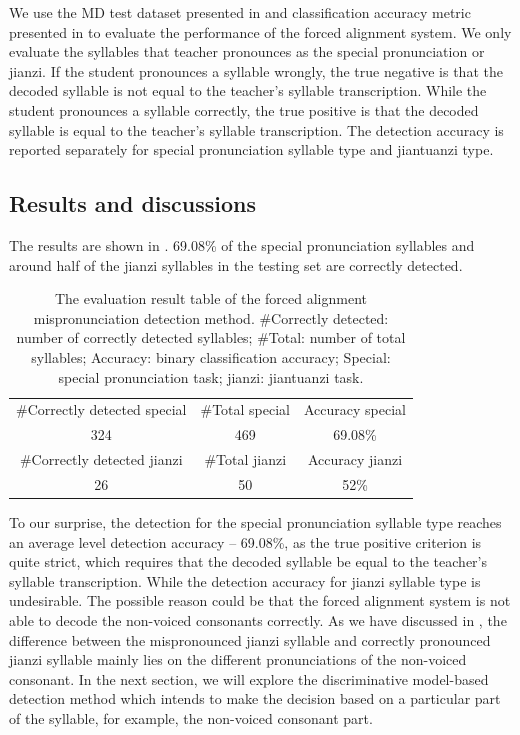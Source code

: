 We use the \gls{MD} test dataset presented in  and classification accuracy metric presented in  to evaluate the performance of the forced alignment system. We only evaluate the syllables that teacher pronounces as the special pronunciation or \gls{jianzi}. If the student pronounces a syllable wrongly, the true negative is that the decoded syllable is not equal to the teacher's syllable transcription. While the student pronounces a syllable correctly, the true positive is that the decoded syllable is equal to the teacher's syllable transcription. The detection accuracy is reported separately for special pronunciation syllable type and \gls{jiantuanzi} type.

\subsection{Results and discussions}

The results are shown in . 69.08\% of the special pronunciation syllables and around half of the \gls{jianzi} syllables in the testing set are correctly detected.

\begin{table}[ht!]
\centering
\caption{The evaluation result table of the forced alignment mispronunciation detection method. \#Correctly detected: number of correctly detected syllables; \#Total: number of total syllables; Accuracy: binary classification accuracy; Special: special pronunciation task; jianzi: jiantuanzi task.}
\label{tab:ch6:forced_alignment_results}
\begin{tabular}{ccc}
\toprule
\#Correctly detected special & \#Total special & Accuracy special \\
324 & 469 & 69.08\% \\
\midrule
\#Correctly detected jianzi & \#Total jianzi & Accuracy jianzi \\
26 & 50 & 52\% \\
\bottomrule
\end{tabular}
\end{table}

To our surprise, the detection for the special pronunciation syllable type reaches an average level detection accuracy -- 69.08\%, as the true positive criterion is quite strict, which requires that the decoded syllable be equal to the teacher's syllable transcription. While the detection accuracy for \gls{jianzi} syllable type is undesirable. The possible reason could be that the forced alignment system is not able to decode the non-voiced consonants correctly. As we have discussed in , the difference between the mispronounced \gls{jianzi} syllable and correctly pronounced \gls{jianzi} syllable mainly lies on the different pronunciations of the non-voiced consonant. In the next section, we will explore the discriminative model-based detection method which intends to make the decision based on a particular part of the syllable, for example, the non-voiced consonant part.

